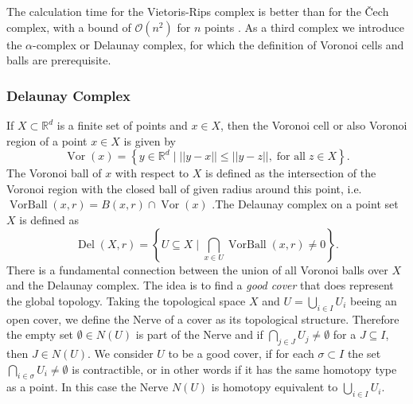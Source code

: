 \documentclass[runningheads]{llncs}
\DeclareMathOperator{\VorBall}{\text{VorBall}}
\DeclareMathOperator{\Vor}{\text{Vor}}
\DeclareMathOperator{\Del}{\text{Del}}
\begin{document}
The calculation time for the Vietoris-Rips complex is better than for the \v{C}ech complex, with a bound of $\mathcal{O}(n^2)$ for $n$ points \cite{Zomorodian10}. As a third complex we introduce the $\alpha$-complex or Delaunay complex, for which the definition of Voronoi cells and balls are prerequisite.


\subsubsection{Delaunay Complex} If $X \subset \mathbb{R}^d$ is a finite set of points and $x \in X$, then the Voronoi cell or also Voronoi region of a point $x \in X$ is given by
\begin{equation}
\label{voronoicell}
\Vor(x) = \left\{ y \in \mathbb{R}^d \; \bigg\vert \; ||y-x|| \leq ||y-z||, \; \text{for all} \; z \in X \right\}.
\end{equation}
The Voronoi ball of $x$ with respect to $X$ is defined as the intersection of the Voronoi region with the closed ball of given radius around this point, i.e.   $\VorBall(x,r) = B(x,r) \cap \Vor(x)$ \cite{bauer2017morse}.The Delaunay complex on a point set $X$ is defined as
\begin{equation}
\label{delaunay}
  \Del(X,r) = \left\{ U \subseteq X \; \bigg\rvert \; \bigcap_{x\in U} \VorBall(x,r) \neq 0 \right\}.
\end{equation}
There is a fundamental connection between the union of all Voronoi balls over $X$ and the Delaunay complex. The idea is to find a \textit{good cover} that does represent the global topology. Taking the topological space $X$ and $U = \bigcup_{i \in I} U_i$ beeing an open cover, we define the Nerve of a cover as its topological structure. Therefore the empty set $\emptyset \in N(U)$ is part of the Nerve and if $\bigcap_{j\in J} U_j \neq \emptyset$ for a $J \subseteq I$, then $J \in N(U)$. We consider $U$ to be a good cover, if for each $\sigma \subset I$ the set $\bigcap_{i\in \sigma} U_i \neq \emptyset$ is contractible, or in other words if it has the same homotopy type as a point. In this case the Nerve $N(U)$ is homotopy equivalent to $\bigcup_{i \in I} U_i$.
\end{document}

